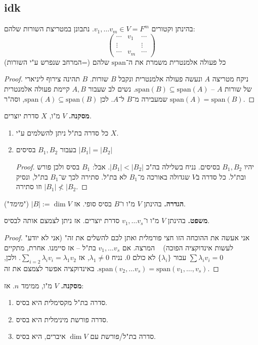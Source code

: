 \documentclass[]{article}
\begin{document}
	\subsection{idk}
	בהינתן וקטורים $v_1, \dots v_m \in V = F^m$. נתבונן במטריצת השורות שלהם: 
	\[ \begin{pmatrix}
		\cdots & v_1 &\cdots \\
		\vdots &  &\vdots \\
		\cdots & v_m &\cdots
	\end{pmatrix} \]
	כל פעולה אלמנטרית משמרת את ה־$\mathrm{span}$ שלהם (=המרחב שנפרש ע"י השורות)
	\begin{proof}
		ניקח מטריצה $A$ ונעשה פעולה אלמנטרית ונקבל $B$ שורות. $B$ תהינה צירוף ליניארי של שורות $A$  – $ \mathrm{span}(B) \subseteq \mathrm{span}(A)$. נשים לב שעבור $A, B$ קיימת פעולה אלמנטרית שמעבירה מ־$B$ ל־$A$. לכן $\mathrm{span}(A) \subseteq \mathrm{span}(B)$, וסה"ר $\mathrm{span}(A) = \mathrm{span}(B)$. 
	\end{proof}
	
	\textbf{מסקנה. }$V$ מ"ו, $X$ סדרת יוצרים.
	\begin{enumerate}
		\item כל סדרה בת"ל ניתן להשלמים ע"י $X$. 
		\item בעבור $B_1, B_2$ בסיסים $|B_1| = |B_2|$
		\begin{proof}
			יהיו $B_1, B_2$ בסיסים. נניח בשלילה בה"כ $|B_1| < |B_2|$. אבל: $B_1$ בסיס ולכן פורש ובת"ל. כל סדרה ב‏$V$ שגדולה באורכה מ־$B_1$ לא בת"ל. סתירה לכך ש־$B_1$ בת"ל, ונסיק $|B_1| \not< |B_2$ וזו סתירה. 
		\end{proof}
	\end{enumerate}
	
	\textbf{הגדרה. }בהינתן $V$ מ"ו ו־$B$ בסיס סופי. אז $|B| := \dim V$ ("\textit{מימד}"). 
	
	\textbf{משפט. }בהינתן $V$ מ"ו ו־$v_1, \dots v_s$ סדרת יוצרים. אז ניתן לצמצם אותה לבסיס. 
	\begin{proof}
		"אני אעשה את ההוכחה הזו חצי פורמלית ואתן לכם להשלים את זה" (אני לא יודע לעשות אינדוקציה הפוכה) ~ המרצה. 
		אם $v_1, \dots v_s$ בת"ל – אז סיימנו. אחרת, מתקיים $\sum \lambda_i v_i = 0$ עבור $\{\lambda_i\}$ לא כולם $0$. נניח $\lambda_1 \neq 0$, אז $\sum_{i = 2}\lambda_iv_i = \lambda_1v_2$. ולכן, $ \mathrm{span}(v_2, \dots v_s) = \mathrm{span}(v_1, \dots, v_s)$. באינדוקציה אפשר לצמצם את זה. 
	\end{proof}
	
	\textbf{מסקנה. }$V$ מ"ו, ממימד $n$. אז: 
	\begin{enumerate}
		\item סדרה בת"ל מקסימלית היא בסיס. 
		\item סדרה פורשת מינימלית היא בסיס. 
		\item סדרה בת"ל/פורשת עם $\dim V$ איברים, היא בסיס. 
	\end{enumerate}
	
\end{document}
